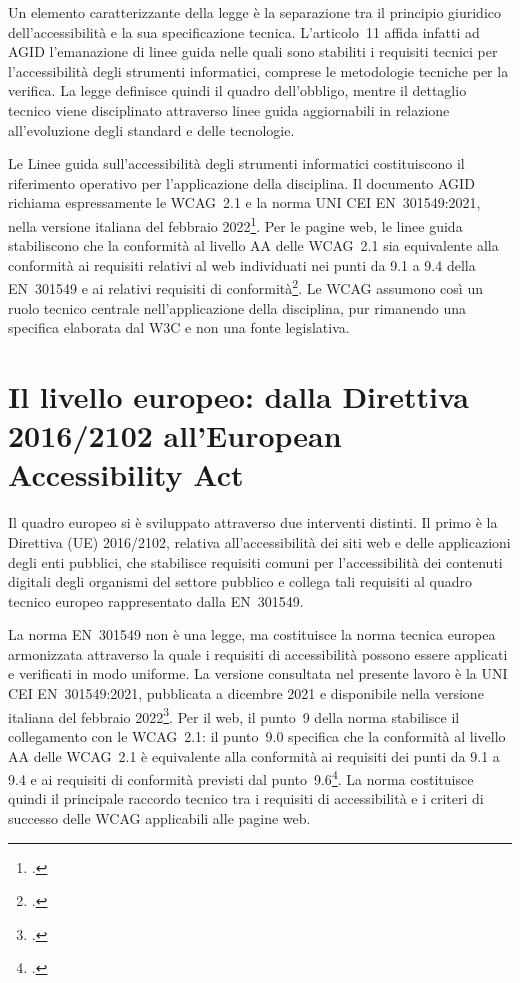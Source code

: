 Un elemento caratterizzante della legge è la separazione tra il principio giuridico dell'accessibilità e la sua specificazione tecnica. L'articolo~11 affida infatti ad AGID l'emanazione di linee guida nelle quali sono stabiliti i requisiti tecnici per l'accessibilità degli strumenti informatici, comprese le metodologie tecniche per la verifica. La legge definisce quindi il quadro dell'obbligo, mentre il dettaglio tecnico viene disciplinato attraverso linee guida aggiornabili in relazione all'evoluzione degli standard e delle tecnologie.

Le Linee guida sull'accessibilità degli strumenti informatici costituiscono il riferimento operativo per l'applicazione della disciplina. Il documento AGID richiama espressamente le WCAG~2.1 e la norma UNI CEI EN~301549:2021, nella versione italiana del febbraio 2022\footcite{agid:lg-stanca}. Per le pagine web, le linee guida stabiliscono che la conformità al livello AA delle WCAG~2.1 sia equivalente alla conformità ai requisiti relativi al web individuati nei punti da 9.1 a 9.4 della EN~301549 e ai relativi requisiti di conformità\footcite[§~2.2]{agid:lg-stanca}. Le WCAG assumono così un ruolo tecnico centrale nell'applicazione della disciplina, pur rimanendo una specifica elaborata dal W3C e non una fonte legislativa.

\section{Il livello europeo: dalla Direttiva 2016/2102 all'European Accessibility Act}

Il quadro europeo si è sviluppato attraverso due interventi distinti. Il primo è la Direttiva (UE) 2016/2102, relativa all'accessibilità dei siti web e delle applicazioni  degli enti pubblici, che stabilisce requisiti comuni per l'accessibilità dei contenuti digitali degli organismi del settore pubblico e collega tali requisiti al quadro tecnico europeo rappresentato dalla EN~301549.

La norma EN~301549 non è una legge, ma costituisce la norma tecnica europea armonizzata attraverso la quale i requisiti di accessibilità possono essere applicati e verificati in modo uniforme. La versione consultata nel presente lavoro è la UNI CEI EN~301549:2021, pubblicata a dicembre 2021 e disponibile nella versione italiana del febbraio 2022\footcite{norma:en301549}. Per il web, il punto~9 della norma stabilisce il collegamento con le WCAG~2.1: il punto~9.0 specifica che la conformità al livello AA delle WCAG~2.1 è equivalente alla conformità ai requisiti dei punti da 9.1 a 9.4 e ai requisiti di conformità previsti dal punto~9.6\footcite[§~9.0]{norma:en301549}. La norma costituisce quindi il principale raccordo tecnico tra i requisiti di accessibilità e i criteri di successo delle WCAG applicabili alle pagine web.

